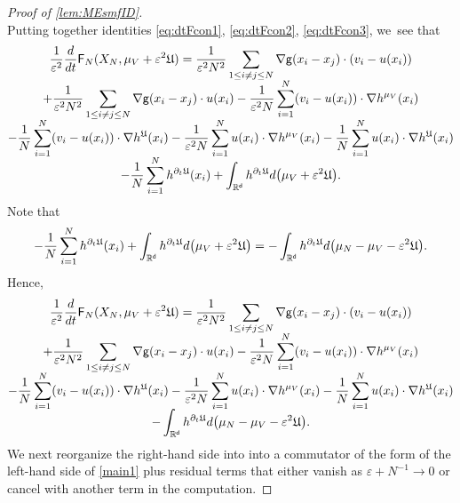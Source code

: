 \documentclass[10pt]{amsart}
\theoremstyle{plain}
\theoremstyle{definition}
\DeclarePairedDelimiter{\pa}{\lparen}{\rparen}
\newcommand{\R}{{\mathbb{R}}}
\let\vep\varepsilon
\let\p\partial
\let\ux X
\newcommand{\Uu}{\mathfrak{U}}
\newcommand{\Fr}{\mathsf{F}}
\renewcommand{\d}{\mathsf{d}}
\newcommand{\g}{{\mathsf{g}}}
\begin{document}
\begin{proof}[Proof of \cref{lem:MEsmfID}]
\begin{equation}
\end{equation}
Putting together identities \eqref{eq:dtFcon1}, \eqref{eq:dtFcon2}, \eqref{eq:dtFcon3}, we~see that\vspace*{-5pt}
\begin{multline*}
\frac{1}{\vep^2}\frac{d}{dt} \Fr_N(\ux_N, \mu_V + \vep^2\Uu) = \frac{1}{\vep^2 N^2}\sum_{1\leq i\neq j\leq N} \nabla\g(x_i-x_j)\cdot \pa*{v_i - u(x_i)} \\[-5pt]
+ \frac{1}{\vep^2N^2}\sum_{1\leq i\neq j\leq N}\nabla\g(x_i-x_j)\cdot u(x_i) -\frac{1}{\vep^2 N}\sum_{i=1}^N \pa*{v_i-u(x_i)}\cdot\nabla h^{\mu_V}(x_i) \\[-5pt]
- \frac{1}{N}\sum_{i=1}^N \pa*{v_i-u(x_i)} \cdot \nabla h^{\Uu}(x_i) -\frac{1}{\vep^2 N}\sum_{i=1}^N u(x_i)\cdot\nabla h^{\mu_V}(x_i)- \frac{1}{N}\sum_{i=1}^N u(x_i) \cdot \nabla h^{\Uu}(x_i)\\[-5pt]
- \frac{1}{N}\sum_{i=1}^N h^{\p_t\Uu}(x_i) + \int_{\R^\d} h^{\p_t\Uu}d\pa*{\mu_V+\vep^2\Uu}.
\end{multline*}
Note that\vspace*{-5pt}
\begin{equation*}
- \frac{1}{N}\sum_{i=1}^N h^{\p_t\Uu}(x_i) + \int_{\R^\d}h^{\p_t\Uu}d\pa*{\mu_V+\vep^2\Uu} =-\int_{\R^\d}h^{\p_t\Uu}d\pa*{\mu_N-\mu_V-\vep^2\Uu}.
\end{equation*}
Hence,\vspace*{-5pt}
\begin{multline}\label{eq:dtFcon'}
\frac{1}{\vep^2}\frac{d}{dt} \Fr_N(\ux_N, \mu_V + \vep^2\Uu) = {\frac{1}{\vep^2 N^2}\sum_{1\leq i\neq j\leq N} \nabla\g(x_i-x_j)\cdot \pa*{v_i - u(x_i)}} \\[-5pt]
+ \frac{1}{\vep^2N^2}\sum_{1\leq i\neq j\leq N}\nabla\g(x_i-x_j)\cdot u(x_i) -\frac{1}{\vep^2 N}\sum_{i=1}^N (v_i-u(x_i))\cdot\nabla h^{\mu_V}(x_i) \\[-5pt]
- \frac{1}{N}\sum_{i=1}^N (v_i-u(x_i)) \cdot \nabla h^{\Uu}(x_i)-\frac{1}{\vep^2N}\sum_{i=1}^N u(x_i)\cdot\nabla h^{\mu_V}(x_i) -\frac{1}{N}\sum_{i=1}^N u(x_i)\cdot\nabla h^{\Uu}(x_i) \\[-5pt]
-\int_{\R^\d} h^{\p_t\Uu}d\pa*{\mu_N-\mu_V-\vep^2\Uu}.
\end{multline}
We next reorganize the right-hand side into into a commutator of the form of the left-hand side of \eqref{main1} plus residual terms that either vanish as $\vep+N^{-1}\to 0$ or cancel with another term in the computation.


\end{proof}
\end{document}

